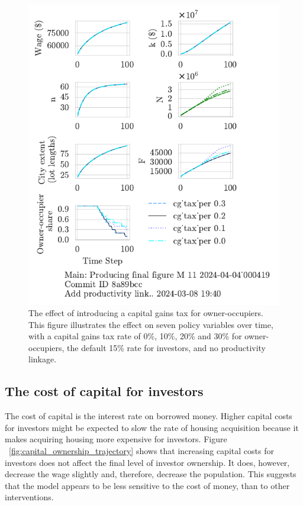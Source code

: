 \begin{figure}[h!t]
\centering
\includegraphics[scale=0.9, trim={0 1.4cm 0 0},clip]{fig/cg_tax_per-000419.pdf}
\caption[The effect of introducing a capital gains tax for owner-occupiers]{The effect of introducing a capital gains tax for owner-occupiers. This figure illustrates the effect on seven policy variables over time, with a capital gains tax rate of 0\%, 10\%, 20\% and 30\% for owner-occupiers, the default 15\% rate for investors, and no productivity linkage.}
\label{fig:CGpers_ownership_trajectory}
\end{figure}


\newpage

\subsection{The cost of capital for investors}
The cost of capital is the interest rate on borrowed money. Higher capital costs for investors might be expected to slow the rate of housing acquisition because it makes acquiring housing more expensive for investors. Figure ~\ref{fig:capital_ownership_trajectory} shows that increasing capital costs for investors does not affect the final level of investor ownership.  It does, however, decrease the wage slightly and, therefore, decrease the population. This suggests that the model appears to be less sensitive to the cost of money, than to other interventions. %


